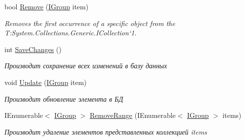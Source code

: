 \begin{DoxyCompactItemize}
bool \hyperlink{class_security_1_1_entity_framework_1_1_collections_1_1_group_collection_ad6df457b47f731ac3b5f5d557c1eb8b3}{Remove} (\hyperlink{interface_security_1_1_interfaces_1_1_model_1_1_i_group}{I\+Group} item)
\begin{DoxyCompactList}\small\item\em Removes the first occurrence of a specific object from the T\+:\+System.\+Collections.\+Generic.\+I\+Collection`1. \end{DoxyCompactList}\item 
int \hyperlink{class_security_1_1_entity_framework_1_1_collections_1_1_group_collection_a36fd03c46992de3ec109f3d5e281701c}{Save\+Changes} ()
\begin{DoxyCompactList}\small\item\em Производит сохранение всех изменений в базу данных \end{DoxyCompactList}\item 
void \hyperlink{class_security_1_1_entity_framework_1_1_collections_1_1_group_collection_a836be65acbb63b2dbdabdcb88e06baeb}{Update} (\hyperlink{interface_security_1_1_interfaces_1_1_model_1_1_i_group}{I\+Group} item)
\begin{DoxyCompactList}\small\item\em Производит обновление элемента в БД \end{DoxyCompactList}\item 
I\+Enumerable$<$ \hyperlink{interface_security_1_1_interfaces_1_1_model_1_1_i_group}{I\+Group} $>$ \hyperlink{class_security_1_1_entity_framework_1_1_collections_1_1_group_collection_ae3f247d3ea1086fc853707040f477840}{Remove\+Range} (I\+Enumerable$<$ \hyperlink{interface_security_1_1_interfaces_1_1_model_1_1_i_group}{I\+Group} $>$ items)
\begin{DoxyCompactList}\small\item\em Производит удаление элементов представленных коллекцией items \end{DoxyCompactList}\end{DoxyCompactItemize}
